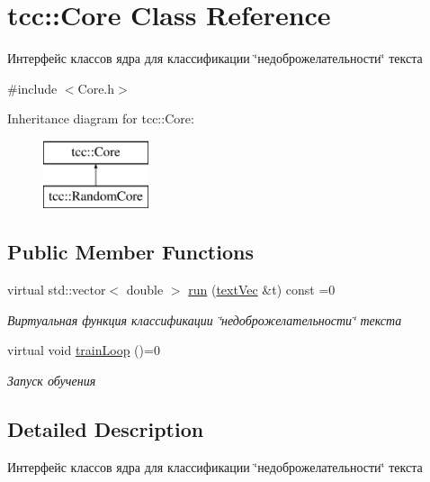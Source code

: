 \hypertarget{classtcc_1_1_core}{}\section{tcc\+:\+:Core Class Reference}
\label{classtcc_1_1_core}


Интерфейс классов ядра для классификации \char`\"{}недоброжелательности\char`\"{} текста  




{\ttfamily \#include $<$Core.\+h$>$}

Inheritance diagram for tcc\+:\+:Core\+:\begin{figure}[H]
\begin{center}
\leavevmode
\includegraphics[height=2.000000cm]{classtcc_1_1_core}
\end{center}
\end{figure}
\subsection*{Public Member Functions}
\begin{DoxyCompactItemize}
\item 
virtual std\+::vector$<$ double $>$ \hyperlink{classtcc_1_1_core_ad7e147dffd871263238079485cfc33e0}{run} (\hyperlink{namespacetcc_a9bdf9e81347b7904a6a7f8427d6465dc}{text\+Vec} \&t) const  =0
\begin{DoxyCompactList}\small\item\em Виртуальная функция классификации \char`\"{}недоброжелательности\char`\"{} текста \end{DoxyCompactList}\item 
virtual void \hyperlink{classtcc_1_1_core_a196d74aa530af660b2ffc4d593554ddd}{train\+Loop} ()=0\hypertarget{classtcc_1_1_core_a196d74aa530af660b2ffc4d593554ddd}{}\label{classtcc_1_1_core_a196d74aa530af660b2ffc4d593554ddd}

\begin{DoxyCompactList}\small\item\em Запуск обучения \end{DoxyCompactList}\end{DoxyCompactItemize}


\subsection{Detailed Description}
Интерфейс классов ядра для классификации \char`\"{}недоброжелательности\char`\"{} текста 

